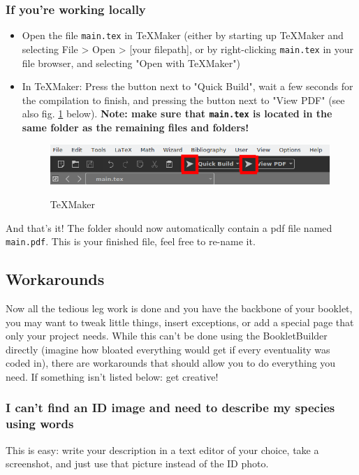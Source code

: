 \documentclass[a4paper,12pt,twoside]{article}
\begin{document}
        \subsubsection{If you're working locally}    
            \begin{itemize}
                \item Open the file \texttt{main.tex} in TeXMaker (either by starting up TeXMaker and selecting File > Open > [your filepath], or by right-clicking \texttt{main.tex} in your file browser, and selecting "Open with TeXMaker")
                \item In TeXMaker: Press the button next to "Quick Build", wait a few seconds for the compilation to finish, and pressing the button next to "View PDF" (see also fig. \ref{fig:texmaker} below). \textbf{Note: make sure that \texttt{main.tex} is located in the same folder as the remaining files and folders!}
                
                \begin{figure}[h]
                    \centering
                    \includegraphics[width=0.8\linewidth]{TeXMaker.png}
                    \label{fig:texmaker}
                    \caption{TeXMaker}
                \end{figure}
            \end{itemize}
            And that's it! The folder should now automatically contain a pdf file named \texttt{main.pdf}. This is your finished file, feel free to re-name it.
            

    \subsection{Workarounds}
        Now all the tedious leg work is done and you have the backbone of your booklet, you may want to tweak little things, insert exceptions, or add a special page that only your project needs. While this can't be done using the BookletBuilder directly (imagine how bloated everything would get if every eventuality was coded in), there are workarounds that should allow you to do everything you need. 
        If something isn't listed below: get creative!

        \subsubsection{I can't find an ID image and need to describe my species using words}
            This is easy: write your description in a text editor of your choice, take a screenshot, and just use that picture instead of the ID photo. \\
\end{document}
